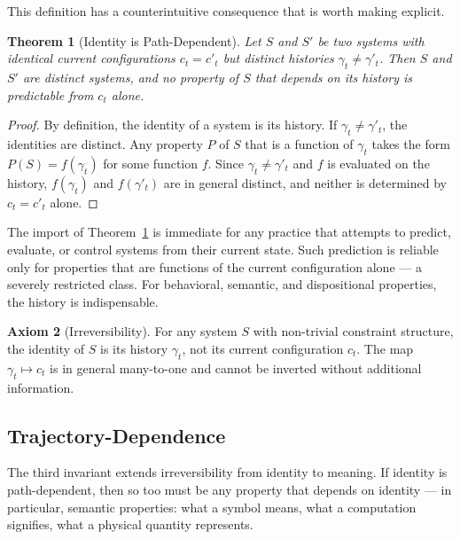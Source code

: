 \documentclass[12pt, twoside]{article}
\theoremstyle{plain}
\newtheorem{theorem}{Theorem}[section]
\theoremstyle{definition}
\newtheorem{axiom}[theorem]{Axiom}
\theoremstyle{remark}
\begin{document}
This definition has a counterintuitive consequence that is worth
making explicit.

\begin{theorem}[Identity is Path-Dependent]
\label{thm:identity}
Let $S$ and $S'$ be two systems with identical current configurations
$c_t = c'_t$ but distinct histories $\gamma_t \neq \gamma'_t$.
Then $S$ and $S'$ are distinct systems, and no property of $S$
that depends on its history is predictable from $c_t$ alone.
\end{theorem}

\begin{proof}
By definition, the identity of a system is its history.
If $\gamma_t \neq \gamma'_t$, the identities are distinct.
Any property $P$ of $S$ that is a function of $\gamma_t$ takes the form
$P(S) = f(\gamma_t)$ for some function $f$.
Since $\gamma_t \neq \gamma'_t$ and $f$ is evaluated on the history,
$f(\gamma_t)$ and $f(\gamma'_t)$ are in general distinct,
and neither is determined by $c_t = c'_t$ alone.
\end{proof}

The import of Theorem~\ref{thm:identity} is immediate for any practice
that attempts to predict, evaluate, or control systems from their
current state.
Such prediction is reliable only for properties that are functions of
the current configuration alone — a severely restricted class.
For behavioral, semantic, and dispositional properties,
the history is indispensable.

\begin{axiom}[Irreversibility]
\label{ax:irrev}
For any system $S$ with non-trivial constraint structure,
the identity of $S$ is its history $\gamma_t$,
not its current configuration $c_t$.
The map $\gamma_t \mapsto c_t$ is in general many-to-one and
cannot be inverted without additional information.
\end{axiom}

\subsection{Trajectory-Dependence}

The third invariant extends irreversibility from identity to meaning.
If identity is path-dependent, then so too must be any property
that depends on identity — in particular, semantic properties:
what a symbol means, what a computation signifies, what a physical
quantity represents.
\end{document}
